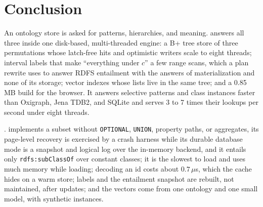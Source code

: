 \section{Conclusion}
\label{sec-conclude}

An ontology store is asked for patterns, hierarchies, and meaning.
\sys answers all three inside one disk-based, multi-threaded engine: a B+ tree
store of three permutations whose latch-free hits and optimistic writers scale to
eight threads; interval labels that make ``everything under $c$'' a few range
scans, which a plan rewrite uses to answer RDFS entailment with the answers of
materialization and none of its storage; vector indexes whose lists live in the
same tree; and a 0.85\,MB build for the browser.
It answers selective patterns and class instances faster than Oxigraph, Jena TDB2,
and SQLite and serves 3 to 7 times their lookups per second under eight threads.

.
\sys implements a \sparql subset without \texttt{OPTIONAL}, \texttt{UNION}, property
paths, or aggregates, its page-level recovery is exercised by a crash harness while
its durable database mode is a snapshot and logical log over the in-memory backend,
and it entails only \texttt{rdfs:subClassOf} over constant
classes; it is the slowest to load and uses much memory while loading; decoding an
id costs about $0.7\,\mu$s, which the cache hides on a warm store; labels and the
entailment snapshot are rebuilt, not maintained, after updates; and the vectors
come from one ontology and one small model, with synthetic instances.
